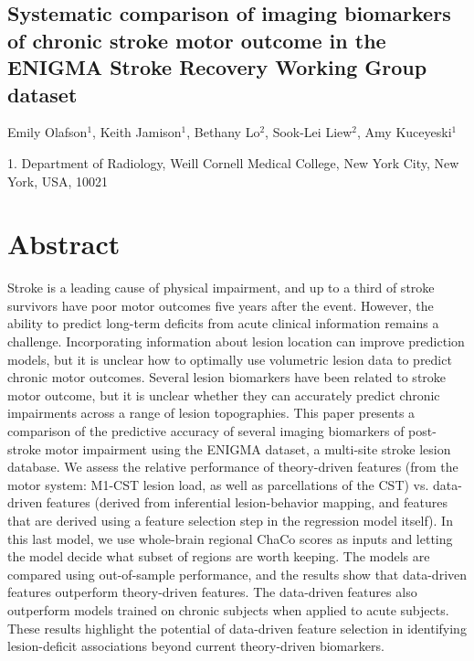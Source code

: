 \documentclass[10pt]{article}
\begin{document}
 

\begin{center}
{\large \section*{Systematic comparison of imaging biomarkers of chronic stroke motor outcome in the ENIGMA Stroke Recovery Working Group dataset}}
\end{center}

\begin{center}
Emily Olafson$^1$, Keith Jamison$^1$, Bethany Lo$^2$, Sook-Lei Liew$^2$, Amy Kuceyeski$^1$
\end{center}

    1. \textmd{Department of Radiology, Weill Cornell Medical College, New York City, New York, USA, 10021} 


\section{Abstract}
Stroke is a leading cause of physical impairment, and up to a third of stroke survivors have poor motor outcomes five years after the event. However, the ability to predict long-term deficits from acute clinical information remains a challenge. Incorporating information about lesion location can improve prediction models, but it is unclear how to optimally use volumetric lesion data to predict chronic motor outcomes. Several lesion biomarkers have been related to stroke motor outcome, but it is unclear whether they can accurately predict chronic impairments across a range of lesion topographies.  This paper presents a comparison of the predictive accuracy of several imaging biomarkers of post-stroke motor impairment using the ENIGMA dataset, a multi-site stroke lesion database. We assess the relative performance of theory-driven features (from the motor system: M1-CST lesion load, as well as parcellations of the CST) vs. data-driven features (derived from inferential lesion-behavior mapping, and features that are derived using a feature selection step in the regression model itself). In this last model, we use whole-brain regional ChaCo scores as inputs and letting the model decide what subset of regions are worth keeping. The models are compared using out-of-sample performance, and the results show that data-driven features outperform theory-driven features. The data-driven features also outperform models trained on chronic subjects when applied to acute subjects. These results highlight the potential of data-driven feature selection in identifying lesion-deficit associations beyond current theory-driven biomarkers.
\end{document}
